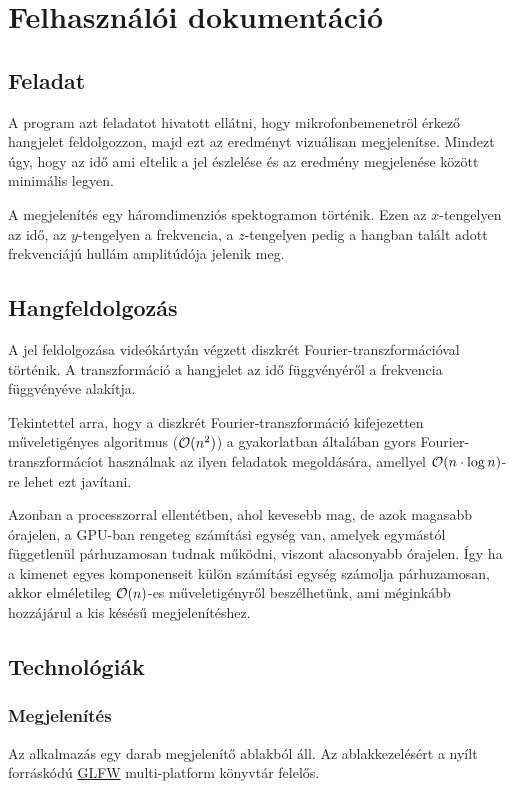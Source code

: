 
\section{Felhaszn\'al\'oi dokument\'aci\'o}
\subsection{Feladat}
A program azt feladatot hivatott ell\'atni, hogy mikrofonbemenetr\"ol \'erkez\H o hangjelet feldolgozzon, majd ezt az eredm\'enyt vizu\'alisan megjelen\'itse. Mindezt \'ugy, hogy az id\H o ami eltelik a jel \'eszlel\'ese \'es az eredm\'eny megjelen\'ese k\"oz\"ott minim\'alis legyen.

A megjelen\'it\'es egy h\'aromdimenzi\'os spektogramon t\"ort\'enik. Ezen az $x$-tengelyen az id\H o, az $y$-tengelyen a frekvencia, a $z$-tengelyen pedig a hangban tal\'alt adott frekvenci\'aj\'u hull\'am amplit\'ud\'oja jelenik meg.

\subsection{Hangfeldolgoz\'as}
A jel feldolgoz\'asa vide\'ok\'arty\'an v\'egzett diszkr\'et Fourier-transzform\'aci\'oval t\"ort\'enik. A transzform\'aci\'o a hangjelet az id\H o f\"uggv\'eny\'er\H ol a frekvencia f\"uggv\'eny\'eve alak\'itja. 

Tekintettel arra, hogy a diszkr\'et Fourier-transzform\'aci\'o kifejezetten m\H uveletig\'enyes algoritmus ($\mathcal{O}(n^2)$) a gyakorlatban \'altal\'aban gyors Fourier-transzform\'ac\'iot haszn\'alnak az ilyen feladatok megold\'as\'ara, amellyel $\mathcal{O}(n\cdot\log n)$-re lehet ezt jav\'itani.

Azonban a processzorral ellent\'etben, ahol kevesebb mag, de azok magasabb \'orajelen, a GPU-ban rengeteg sz\'am\'it\'asi egys\'eg van, amelyek egym\'ast\'ol f\"uggetlen\"ul p\'arhuzamosan tudnak m\H uk\"odni, viszont alacsonyabb \'orajelen. \'Igy ha a kimenet egyes  komponenseit k\"ul\"on sz\'am\'it\'asi egys\'eg sz\'amolja p\'arhuzamosan, akkor elm\'eletileg $\mathcal{O}(n)$-es m\H uveletig\'enyr\H ol besz\'elhet\"unk, ami m\'egink\'abb hozz\'aj\'arul a kis k\'es\'es\H u megjelen\'it\'eshez. 


\subsection{Technol\'ogi\'ak}
\subsubsection{Megjelen\'it\'es}
Az alkalmaz\'as egy darab megjelen\'it\H o ablakb\'ol \'all. Az ablakkezel\'es\'ert a ny\'ilt forr\'ask\'od\'u \href{http://www.glfw.org/}{GLFW} multi-platform k\"onyvt\'ar felel\H os.

